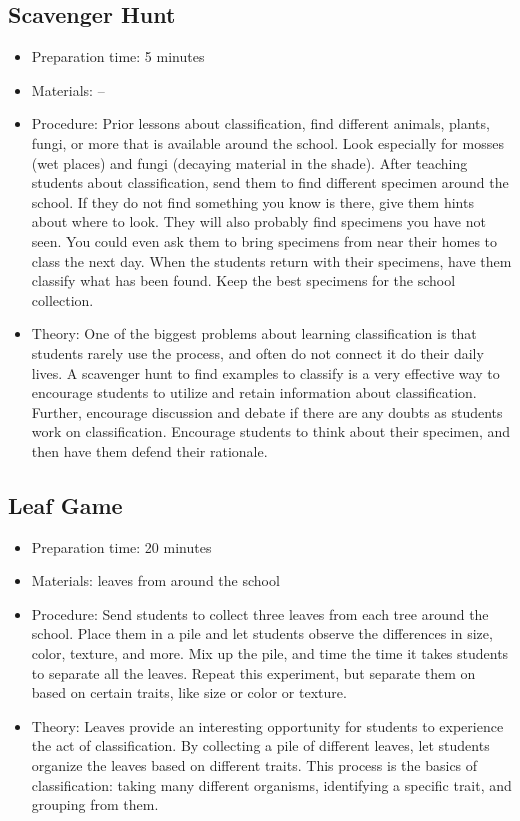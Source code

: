 \subsection{Scavenger Hunt}
\begin{itemize}
\item{Preparation time: 5 minutes}
\item{Materials: --}
\item{Procedure: Prior lessons about classification, find different animals, plants, fungi, or more that is available around the school. Look especially for mosses (wet places) and fungi (decaying material in the shade). After teaching students about classification, send them to find different specimen around the school. If they do not find something you know is there, give them hints about where to look. They will also probably find specimens you have not seen. You could even ask them to bring specimens from near their homes to class the next day. When the students return with their specimens, have them classify what has been found. Keep the best specimens for the school collection.}
\item{Theory: One of the biggest problems about learning classification is that students rarely use the process, and often do not connect it do their daily lives. A scavenger hunt to find examples to classify is a very effective way to encourage students to utilize and retain information about classification. Further, encourage discussion and debate if there are any doubts as students work on classification. Encourage students to think about their specimen, and then have them defend their rationale.}
\end{itemize}


\subsection{Leaf Game}
\begin{itemize}
\item{Preparation time: 20 minutes}
\item{Materials: leaves from around the school}
\item{Procedure: Send students to collect three leaves from each tree around the school. Place them in a pile and let students observe the differences in size, color, texture, and more. Mix up the pile, and time the time it takes students to separate all the leaves. Repeat this experiment, but separate them on based on certain traits, like size or color or texture.}
\item{Theory: Leaves provide an interesting opportunity for students to experience the act of classification. By collecting a pile of different leaves, let students organize the leaves based on different traits. This process is the basics of classification: taking many different organisms, identifying a specific trait, and grouping from them.}
\end{itemize}

